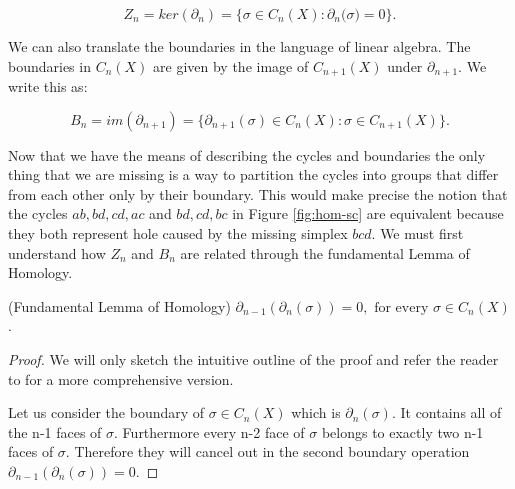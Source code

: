 $$ Z_n = ker(\partial_n) = \Big\{\sigma \in C_{n}(X): \partial_n\big(\sigma\big) = 0 \Big\}. $$

We can also translate the boundaries in the language of linear algebra. The boundaries in $C_n(X)$ are given by the image of $C_{n+1}(X)$ under $\partial_{n+1}$. We write this as:


$$ B_n = im(\partial_{n+1}) = \Big\{\partial_{n+1}(\sigma) \in C_{n}(X): \sigma \in C_{n+1}(X) \Big\}. $$




Now that we have the means of describing the cycles and boundaries the only thing that we are missing is a way to partition the cycles into groups that differ from each other only by their boundary. This would make precise the notion that the cycles $ab, bd, cd, ac$ and $bd, cd, bc$ in Figure \ref{fig:hom-sc} are equivalent because they both represent hole caused by the missing simplex $bcd$. We must first understand how $Z_n$ and $B_n$ are related through the fundamental Lemma of Homology.

\begin{lem} (Fundamental Lemma of Homology) $\partial_{n-1}(\partial_n(\sigma)) = 0, \text{ for every } \sigma \in C_{n}(X)$. \end{lem}

\begin{proof}
    We will only sketch the intuitive outline of the proof and refer the reader to \cite{algebraic-topology} for a more comprehensive version.

    Let us consider the boundary of $\sigma \in C_n(X)$ which is $\partial_n(\sigma)$. It contains all of the n-1 faces of $\sigma$. Furthermore every n-2 face of $\sigma$ belongs to exactly two n-1 faces of $\sigma$. Therefore they will cancel out in the second boundary operation $\partial_{n-1}(\partial_n(\sigma)) = 0$.
\end{proof}



